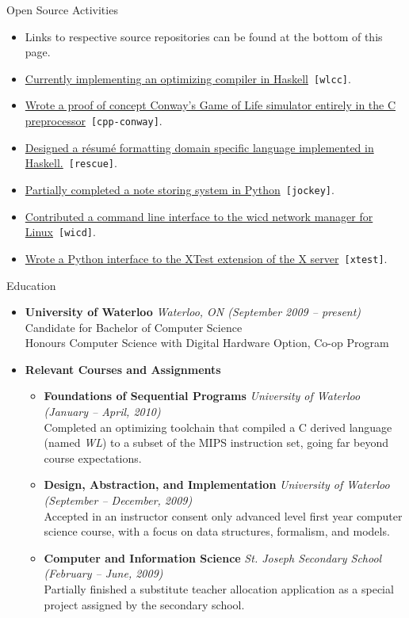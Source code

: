 \documentclass[11pt,oneside]{article}
\newcommand{\respara}[1]{
    \vspace{4pt}
    {\fontfamily{phv} \selectfont \Large #1} \\
    \vspace{4pt}
    \hspace{19pt}
}
\newenvironment{ressection}[1]{
    \respara{#1}
    \begin{itemize}
    \vspace{-20pt}
}{
    \end{itemize}
}
\newcommand{\resitem}[1]{
    \vspace{-4pt}
    \item \begin{flushleft} #1 \end{flushleft}
}
\newcommand{\resbigitem}[3]{
    \item
    \textbf{#1} \hfill \textit{#2} \\
    #3
}
\newenvironment{reslist}[1]{
    \resitem{\textbf{#1}}
    \vspace{-5pt}
    \begin{itemize}
}{
    \end{itemize}
}
\begin{document}
\pagebreak

\begin{ressection}{Open Source Activities}
    \item[] \hspace{-2.6em} Links to respective source repositories can be found at the bottom of this page.

    \resitem{\href{https://github.com/rraval/wlcc}{Currently implementing an optimizing compiler in
        Haskell}~\texttt{[wlcc]}.}

    \resitem{\href{http://zeroindexed.com/cpp-conway}{Wrote a proof of concept Conway's Game of Life
        simulator entirely in the C preprocessor}~\texttt{[cpp-conway]}.}

    \resitem{\href{https://github.com/rraval/Rescue}{Designed a r\'{e}sum\'{e} formatting domain
        specific language implemented in Haskell.}~\texttt{[rescue]}.}

    \resitem{\href{http://gitorious.org/jockey}{Partially completed a note storing system in
        Python}~\texttt{[jockey]}.}

    \resitem{\href{http://launchpad.net/wicd}{Contributed a command line interface to the wicd
        network manager for Linux}~\texttt{[wicd]}.}

    \resitem{\href{http://code.launchpad.net/~ronuk-raval/+junk/xtest}{Wrote a Python interface
        to the XTest extension of the X server}~\texttt{[xtest]}.}

\end{ressection}

\begin{ressection}{Education}

    \resbigitem{University of Waterloo}{Waterloo, ON (September 2009 -- present)}
        {Candidate for Bachelor of Computer Science\\Honours Computer Science
            with Digital Hardware Option, Co-op Program}

    \begin{reslist}{Relevant Courses and Assignments}

        \resbigitem{Foundations of Sequential Programs}{University of Waterloo (January -- April, 2010)}
            {Completed an optimizing toolchain that compiled a C derived
            language (named \textit{WL}) to a subset of the MIPS instruction set,
            going far beyond course expectations.}

        \resbigitem{Design, Abstraction, and Implementation}{University of Waterloo (September -- December, 2009)}
            {Accepted in an instructor consent only advanced level first year
            computer science course, with a focus on data structures, formalism,
            and models.}

        \resbigitem{Computer and Information Science}{St. Joseph Secondary School (February -- June, 2009)}
            {Partially finished a substitute teacher allocation
            application as a special project assigned by the secondary school.}

    \end{reslist}

\end{ressection}
\end{document}
